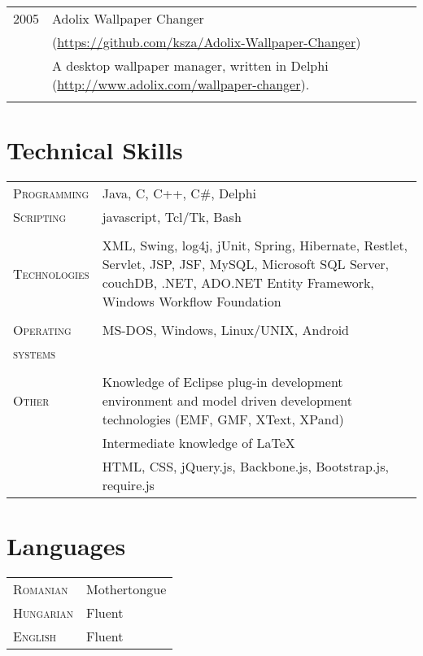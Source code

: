 \documentclass[a4paper,10pt]{article}
\begin{document}
\begin{longtable}{p{2.5cm}|p{11cm}}
 \raggedleft \textsc{2005} & Adolix Wallpaper Changer \\
 &
 \footnotesize{(\url{https://github.com/ksza/Adolix-Wallpaper-Changer})}\\
 & \footnotesize{A
 desktop wallpaper manager, written in Delphi
 (\url{http://www.adolix.com/wallpaper-changer}).} \\
 \multicolumn{2}{c}{} \\
\end{longtable}

\section{Technical Skills}
\begin{tabular}{p{2.5cm}p{11cm}}
\textsc{Programming} & Java, C, C++, C\#, Delphi\\
\textsc{Scripting} & javascript, Tcl/Tk, Bash\\ 
\multicolumn{2}{c}{} \\ 
\textsc{Technologies} & XML, Swing, log4j, jUnit, Spring, Hibernate, Restlet, Servlet, JSP, JSF, MySQL, Microsoft SQL Server, couchDB, .NET, ADO.NET Entity Framework, Windows Workflow Foundation\\ 
 \multicolumn{2}{c}{} \\
 \textsc{Operating} & MS-DOS, Windows, Linux/UNIX, Android\\
 \textsc{systems}&\\ 
 \multicolumn{2}{c}{} \\
 \textsc{Other} & Knowledge of Eclipse plug-in development environment and model
 driven development technologies (EMF, GMF, XText, XPand)\\
 & Intermediate knowledge of \LaTeX \\
 & HTML, CSS, jQuery.js, Backbone.js, Bootstrap.js, require.js\\
\end{tabular}

\section{Languages}
\begin{tabular}{p{2.5cm}p{11cm}}
\textsc{Romanian}& Mothertongue\\
\textsc{Hungarian}& Fluent\\
\textsc{English}& Fluent\\
\end{tabular}
\end{document}
